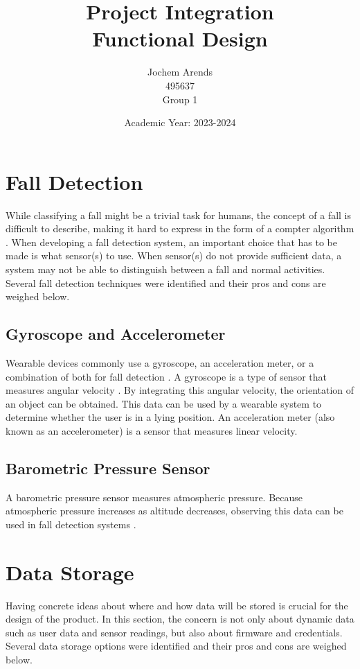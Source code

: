 \documentclass{article}
\title{Project Integration \\ Functional Design}
\author{Jochem Arends \\ 495637 \\ Group 1}
\date{Academic Year: 2023-2024}
\begin{document}
\maketitle
\newpage

\tableofcontents
\clearpage

\section{Fall Detection}

While classifying a fall might be a trivial task for humans, the concept of a fall is difficult to describe, making it hard to express in the form of a compter algorithm \cite{noury-2007}.
When developing a fall detection system, an important choice that has to be made is what sensor(s) to use.
When sensor(s) do not provide sufficient data, a system may not be able to distinguish between a fall and normal activities.
Several fall detection techniques were identified and their pros and cons are weighed below.

\subsection{Gyroscope and Accelerometer}

Wearable devices commonly use a gyroscope, an acceleration meter, or a combination of both for fall detection \cite{delahoz-2014}.
A gyroscope is a type of sensor that measures angular velocity \cite{passaro-2017}.
By integrating this angular velocity, the orientation of an object can be obtained.
This data can be used by a wearable system to determine whether the user is in a lying position.
An acceleration meter (also known as an accelerometer) is a sensor that measures linear velocity.

\subsection{Barometric Pressure Sensor}

A barometric pressure sensor measures atmospheric pressure.
Because atmospheric pressure increases as altitude decreases, observing this data can be used in fall detection systems \cite{sun-2019}.

\section{Data Storage}

Having concrete ideas about where and how data will be stored is crucial for the design of the product.
In this section, the concern is not only about dynamic data such as user data and sensor readings, but also about firmware and credentials.
Several data storage options were identified and their pros and cons are weighed below.
\end{document}
